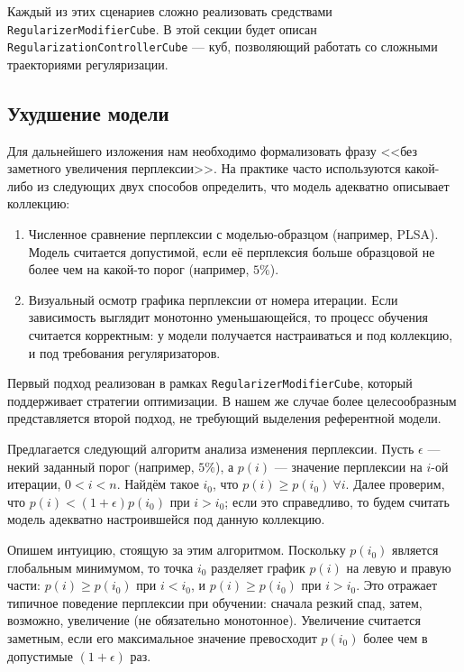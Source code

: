 Каждый из этих сценариев сложно реализовать средствами \texttt{RegularizerModifierCube}. В этой секции будет описан \texttt{RegularizationControllerCube} --- куб, позволяющий работать со сложными траекториями регуляризации.

\subsection{Ухудшение модели}

Для дальнейшего изложения нам необходимо формализовать фразу <<без заметного увеличения перплексии>>. На практике часто используются какой-либо из следующих двух способов определить, что модель адекватно описывает коллекцию: 

\begin{enumerate}
    \item Численное сравнение перплексии с моделью-образцом (например, PLSA). Модель считается допустимой, если её перплексия больше образцовой не более чем на какой-то порог (например, $5\%$).
    \item Визуальный осмотр графика перплексии от номера итерации. Если зависимость выглядит монотонно уменьшающейся, то процесс обучения считается корректным: у модели получается настраиваться и под коллекцию, и под требования регуляризаторов.
\end{enumerate}

Первый подход реализован в рамках \texttt{RegularizerModifierCube}, который поддерживает стратегии оптимизации. В нашем же случае более целесообразным представляется второй подход, не требующий выделения референтной модели.

Предлагается следующий алгоритм анализа изменения перплексии. Пусть $\epsilon$ --- некий заданный порог (например, $5\%$), а  $p(i)$ --- значение перплексии на $i$-ой итерации, $0 < i < n$. Найдём такое $i_0$, что $p(i) \geq p(i_0)~\forall i$. Далее проверим, что $p(i) < (1 + \epsilon) p(i_0)$ при $i > i_0$; если это справедливо, то будем считать модель адекватно настроившейся под данную коллекцию.  

Опишем интуицию, стоящую за этим алгоритмом. Поскольку $p(i_0)$ является глобальным минимумом, то точка $i_0$ разделяет график $p(i)$ на левую и правую части: $p(i) \geq p(i_0)$ при $i < i_0$, и $p(i) \geq p(i_0)$ при $i > i_0$. Это отражает типичное поведение перплексии при обучении: сначала резкий спад, затем, возможно, увеличение (не обязательно монотонное). Увеличение считается заметным, если его максимальное значение превосходит $p(i_0)$ более чем в допустимые $(1 + \epsilon)$ раз.

